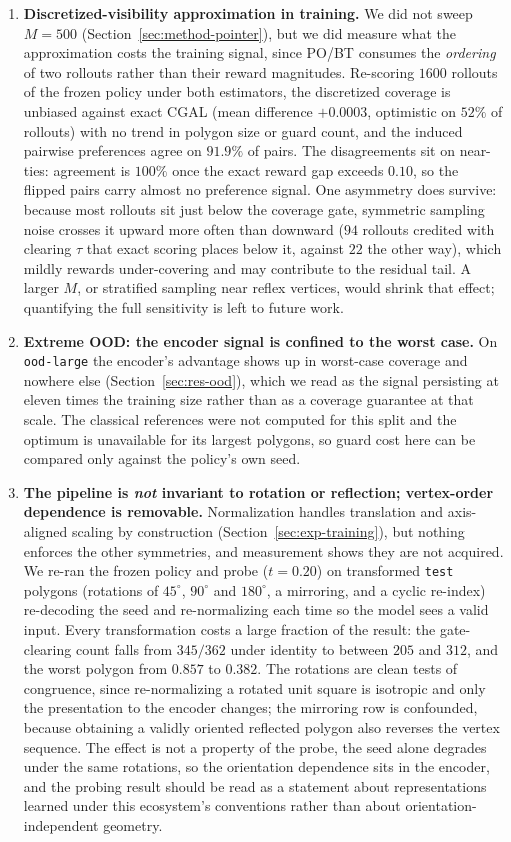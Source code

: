 \documentclass[11pt]{article}
\begin{document}
\begin{enumerate}
  \item \textbf{Discretized-visibility approximation in training.} We did not sweep $M = 500$ (Section~\ref{sec:method-pointer}), but we did measure what the approximation costs the training signal, since PO/BT consumes the \emph{ordering} of two rollouts rather than their reward magnitudes. Re-scoring $1600$ rollouts of the frozen policy under both estimators, the discretized coverage is unbiased against exact CGAL (mean difference $+0.0003$, optimistic on $52\%$ of rollouts) with no trend in polygon size or guard count, and the induced pairwise preferences agree on $91.9\%$ of pairs. The disagreements sit on near-ties: agreement is $100\%$ once the exact reward gap exceeds $0.10$, so the flipped pairs carry almost no preference signal. One asymmetry does survive: because most rollouts sit just below the coverage gate, symmetric sampling noise crosses it upward more often than downward ($94$ rollouts credited with clearing $\tau$ that exact scoring places below it, against $22$ the other way), which mildly rewards under-covering and may contribute to the residual tail. A larger $M$, or stratified sampling near reflex vertices, would shrink that effect; quantifying the full sensitivity is left to future work.
  \item \textbf{Extreme OOD: the encoder signal is confined to the worst case.} On \texttt{ood-large} the encoder's advantage shows up in worst-case coverage and nowhere else (Section~\ref{sec:res-ood}), which we read as the signal persisting at eleven times the training size rather than as a coverage guarantee at that scale. The classical references were not computed for this split and the optimum is unavailable for its largest polygons, so guard cost here can be compared only against the policy's own seed.
  \item \textbf{The pipeline is \emph{not} invariant to rotation or reflection; vertex-order dependence is removable.} Normalization handles translation and axis-aligned scaling by construction (Section~\ref{sec:exp-training}), but nothing enforces the other symmetries, and measurement shows they are not acquired. We re-ran the frozen policy and probe ($t = 0.20$) on transformed \texttt{test} polygons (rotations of $45^\circ$, $90^\circ$ and $180^\circ$, a mirroring, and a cyclic re-index) re-decoding the seed and re-normalizing each time so the model sees a valid input. Every transformation costs a large fraction of the result: the gate-clearing count falls from $345/362$ under identity to between $205$ and $312$, and the worst polygon from $0.857$ to $0.382$. The rotations are clean tests of congruence, since re-normalizing a rotated unit square is isotropic and only the presentation to the encoder changes; the mirroring row is confounded, because obtaining a validly oriented reflected polygon also reverses the vertex sequence. The effect is not a property of the probe, the seed alone degrades under the same rotations, so the orientation dependence sits in the encoder, and the probing result should be read as a statement about representations learned under this ecosystem's conventions rather than about orientation-independent geometry.


\end{enumerate}
\end{document}
